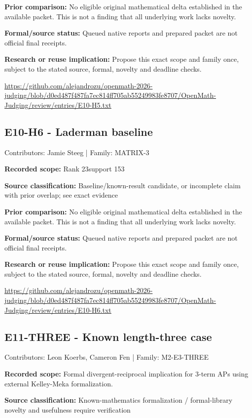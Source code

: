 \documentclass[11pt,a4paper]{article}
\begin{document}
\textbf{Prior comparison:} No eligible original mathematical delta established in the available packet. This is not a finding that all underlying work lacks novelty.

\textbf{Formal/source status:} Queued native reports and prepared packet are not official final receipts.

\textbf{Research or reuse implication:} Propose this exact scope and family once, subject to the stated source, formal, novelty and deadline checks.

{\small \url{https://github.com/alejandrozu/openmath-2026-judging/blob/d0ed487f487fa7ec814ff705ab55249983fe8707/OpenMath-Judging/review/entries/E10-H5.txt}\par}

\begin{samepage}
\subsection{E10-H6  -  Laderman baseline}
{\small Contributors: Jamie Steeg | Family: MATRIX-3\par}

\textbf{Recorded scope:} Rank 23support 153

\end{samepage}
\textbf{Source classification:} Baseline/known-result candidate, or incomplete claim with prior overlap; see exact evidence

\textbf{Prior comparison:} No eligible original mathematical delta established in the available packet. This is not a finding that all underlying work lacks novelty.

\textbf{Formal/source status:} Queued native reports and prepared packet are not official final receipts.

\textbf{Research or reuse implication:} Propose this exact scope and family once, subject to the stated source, formal, novelty and deadline checks.

{\small \url{https://github.com/alejandrozu/openmath-2026-judging/blob/d0ed487f487fa7ec814ff705ab55249983fe8707/OpenMath-Judging/review/entries/E10-H6.txt}\par}

\begin{samepage}
\subsection{E11-THREE  -  Known length-three case}
{\small Contributors: Leon Koerbs, Cameron Fen | Family: M2-E3-THREE\par}

\textbf{Recorded scope:} Formal divergent-reciprocal implication for 3-term APs using external Kelley-Meka formalization.

\end{samepage}
\textbf{Source classification:} Known-mathematics formalization / formal-library novelty and usefulness require verification
\end{document}
